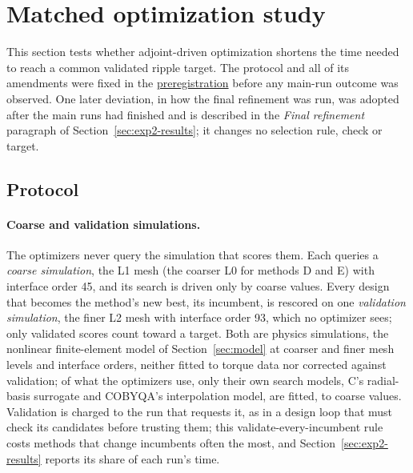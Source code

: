 \section{Matched optimization study}\label{sec:optimization}
This section tests whether adjoint-driven optimization shortens the time
needed to reach a common validated ripple target. The protocol and all of
its amendments were fixed in the
\href{https://github.com/rjwalters/geode-fem/issues/1185}{preregistration}
before any main-run outcome was observed. One later deviation, in how the
final refinement was run, was adopted after the main runs had finished and
is described in the \emph{Final refinement} paragraph of
Section~\ref{sec:exp2-results}; it changes no selection rule, check or
target.

\subsection{Protocol}
\paragraph{Coarse and validation simulations.}
The optimizers never query the simulation that scores them. Each queries a
\emph{coarse simulation}, the L1 mesh (the coarser L0 for methods D and E)
with interface order 45, and its search is driven only by coarse values.
Every design that becomes the method's new best, its incumbent, is rescored
on one \emph{validation simulation}, the finer L2 mesh with interface order
93, which no optimizer sees; only validated scores count toward a target.
Both are physics simulations, the nonlinear finite-element model of
Section~\ref{sec:model} at coarser and finer mesh levels and interface orders, neither
fitted to torque data nor corrected against validation; of what the
optimizers use, only their own search models, C's radial-basis surrogate
and COBYQA's interpolation model, are fitted, to coarse values.
Validation is charged to the run that requests it, as in a
design loop that must check its candidates before trusting them; this
validate-every-incumbent rule costs methods that change incumbents often
the most, and Section~\ref{sec:exp2-results} reports its share of each
run's time.

